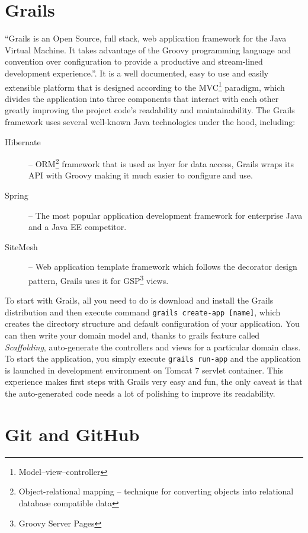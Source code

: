 \section{Grails}

``Grails is an Open Source, full stack, web application framework for the Java Virtual Machine. It takes advantage of the Groovy programming language and convention over configuration to provide a productive and stream-lined development experience.''\cite{grails-homepage}. It is a well documented\cite{grails-documentation}, easy to use and easily extensible platform that is designed according to the MVC\footnote{Model--view--controller} paradigm, which divides the application into three components that interact with each other greatly improving the project code's readability and maintainability. The Grails framework uses several well-known Java technologies under the hood, including:

\begin{description}
    \item[Hibernate] -- ORM\footnote{Object-relational mapping -- technique for converting objects into relational database compatible data} framework that is used as layer for data access, Grails wraps its API with Groovy making it much easier to configure and use.
    \item[Spring] -- The most popular application development framework for enterprise Java\cite{springsource-homepage} and a Java EE competitor.
    \item[SiteMesh] -- Web application template framework which follows the decorator design pattern, Grails uses it for GSP\footnote{Groovy Server Pages} views.
\end{description}

To start with Grails, all you need to do is download and install the Grails distribution and then execute command \texttt{grails create-app [name]}, which creates the directory structure and default configuration of your application. You can then write your domain model and, thanks to grails feature called \emph{Scaffolding}, auto-generate the controllers and views for a particular domain class. To start the application, you simply execute \texttt{grails run-app} and the application is launched in development environment on Tomcat 7 servlet container. This experience makes first steps with Grails very easy and fun, the only caveat is that the auto-generated code needs a lot of polishing to improve its readability.

\section{Git and GitHub}


